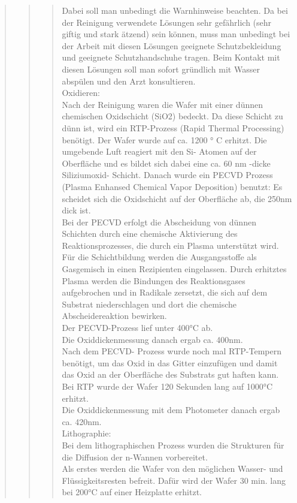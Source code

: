 \begin{quote}
\begin{quote}
\begin{quote}
			Dabei  soll man unbedingt die Warnhinweise beachten. Da bei der 
			Reinigung verwendete Lösungen sehr gefährlich (sehr giftig und stark 
			ätzend) sein können, muss man unbedingt bei der Arbeit mit diesen 
			Lösungen geeignete Schutzbekleidung und geeignete Schutzhandschuhe 
			tragen. Beim Kontakt mit diesen Lösungen soll man sofort gründlich
			mit Wasser abspülen und den Arzt konsultieren.\\
			
			Oxidieren:\\
			
			Nach der Reinigung waren die Wafer mit einer dünnen chemischen 
			Oxidschicht (SiO2)  bedeckt. Da diese Schicht zu dünn ist, wird ein 
			RTP-Prozess (Rapid Thermal Processing) benötigt.  Der Wafer wurde 
			auf ca. 1200 ° C erhitzt.  Die umgebende Luft reagiert mit den Si- 
			Atomen auf der Oberfläche und es bildet sich dabei eine ca. 60 nm 
			-dicke Siliziumoxid- Schicht. Danach wurde ein PECVD Prozess 
			(Plasma Enhansed Chemical Vapor Deposition) benutzt: Es scheidet 
			sich die Oxidschicht  auf der Oberfläche ab, die 250nm dick ist.\\

			Bei der PECVD erfolgt die Abscheidung von dünnen Schichten durch 
			eine chemische Aktivierung des Reaktionsprozesses, die durch ein 
			Plasma unterstützt wird.\\
			Für die Schichtbildung werden die Ausgangsstoffe als Gasgemisch in 
			einen Rezipienten eingelassen. Durch erhitztes Plasma werden die 
			Bindungen des Reaktionsgases aufgebrochen und in Radikale zersetzt, 
			die sich auf dem Substrat niederschlagen und dort die chemische 
			Abscheidereaktion bewirken.\\
 			Der PECVD-Prozess lief unter 400°C ab.\\
 			Die Oxiddickenmessung danach ergab ca. 400nm.\\

			Nach dem PECVD- Prozess wurde noch mal RTP-Tempern benötigt, um das 
			Oxid in das Gitter einzufügen und damit das Oxid an der Oberfläche 
			des Substrats gut haften kann. Bei RTP wurde der Wafer 120 Sekunden  
			lang auf 1000°C erhitzt.\\
			Die Oxiddickenmessung mit dem Photometer danach ergab ca. 420nm.\\
			
			Lithographie:\\
			
			Bei dem lithographischen Prozess wurden die Strukturen für die 
			Diffusion der n-Wannen vorbereitet.\\
			Als erstes werden die Wafer von den möglichen Wasser- und 
			Flüssigkeitsresten befreit. Dafür wird der Wafer 30 min. lang bei 
			200°C auf einer Heizplatte erhitzt.\\
			

\end{quote}
\end{quote}
\end{quote}
